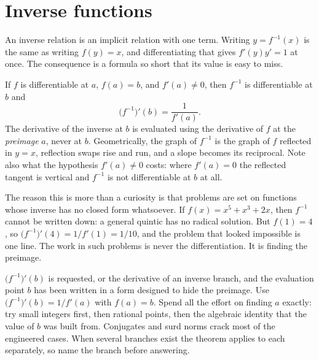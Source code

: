 \section{Inverse functions}

An inverse relation is an implicit relation with one term. Writing $y=f^{-1}(x)$ is the same as writing $f(y)=x$, and differentiating that gives $f'(y)y'=1$ at once. The consequence is a formula so short that its value is easy to miss.

\begin{keynote}
If $f$ is differentiable at $a$, $f(a)=b$, and $f'(a)\neq0$, then $f^{-1}$ is differentiable at $b$ and
\[
\bigl(f^{-1}\bigr)'(b)=\frac{1}{f'(a)} .
\]
The derivative of the inverse at $b$ is evaluated using the derivative of $f$ at the \emph{preimage} $a$, never at $b$. Geometrically, the graph of $f^{-1}$ is the graph of $f$ reflected in $y=x$, reflection swaps rise and run, and a slope becomes its reciprocal. Note also what the hypothesis $f'(a)\neq0$ costs: where $f'(a)=0$ the reflected tangent is vertical and $f^{-1}$ is not differentiable at $b$ at all.
\end{keynote}

The reason this is more than a curiosity is that problems are set on functions whose inverse has no closed form whatsoever. If $f(x)=x^{5}+x^{3}+2x$, then $f^{-1}$ cannot be written down: a general quintic has no radical solution. But $f(1)=4$, so $\bigl(f^{-1}\bigr)'(4)=1/f'(1)=1/10$, and the problem that looked impossible is one line. The work in such problems is never the differentiation. It is finding the preimage.

\cue $\bigl(f^{-1}\bigr)'(b)$ is requested, or the derivative of an inverse branch, and the evaluation point $b$ has been written in a form designed to hide the preimage.
\method Use $\bigl(f^{-1}\bigr)'(b)=1/f'(a)$ with $f(a)=b$. Spend all the effort on finding $a$ exactly: try small integers first, then rational points, then the algebraic identity that the value of $b$ was built from. Conjugates and surd norms crack most of the engineered cases. When several branches exist the theorem applies to each separately, so name the branch before answering.

